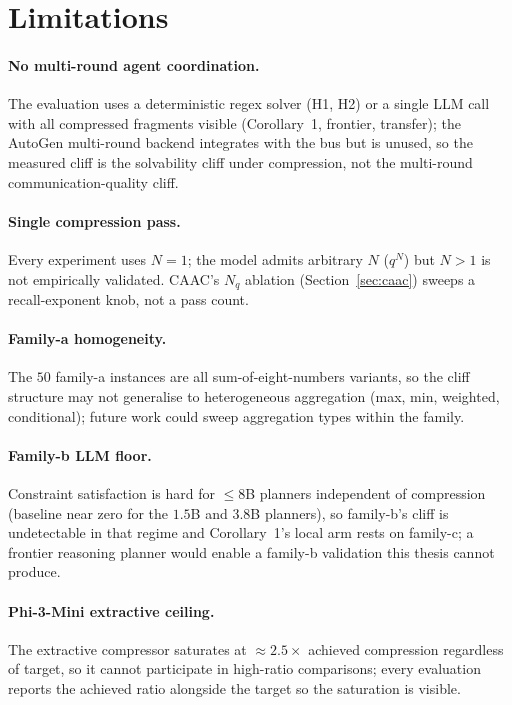 \section{Limitations}
\label{sec:limitations}

\paragraph{No multi-round agent coordination.}
The evaluation uses a deterministic regex solver (H1, H2) or a single
LLM call with all compressed fragments visible (Corollary~1,
frontier, transfer); the AutoGen multi-round backend integrates with
the bus but is unused, so the measured cliff is the solvability cliff
under compression, not the multi-round communication-quality cliff.

\paragraph{Single compression pass.}
Every experiment uses $N=1$; the model admits arbitrary $N$ ($q^N$)
but $N>1$ is not empirically validated. CAAC's $N_q$ ablation
(Section~\ref{sec:caac}) sweeps a recall-exponent knob, not a pass
count.

\paragraph{Family-a homogeneity.}
The $50$ family-a instances are all sum-of-eight-numbers variants, so
the cliff structure may not generalise to heterogeneous aggregation
(max, min, weighted, conditional); future work could sweep
aggregation types within the family.

\paragraph{Family-b LLM floor.}
Constraint satisfaction is hard for $\le8$B planners independent of
compression (baseline near zero for the $1.5$B and $3.8$B planners),
so family-b's cliff is undetectable in that regime and Corollary~1's
local arm rests on family-c; a frontier reasoning planner would
enable a family-b validation this thesis cannot produce.

\paragraph{Phi-3-Mini extractive ceiling.}
The extractive compressor saturates at $\approx2.5\times$ achieved
compression regardless of target, so it cannot participate in
high-ratio comparisons; every evaluation reports the achieved ratio
alongside the target so the saturation is visible.

